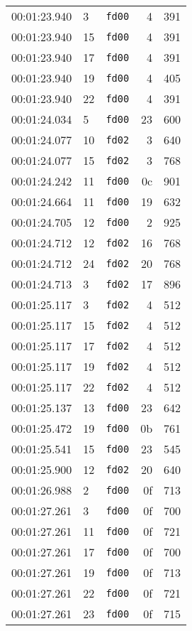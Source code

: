 \documentclass{article}
\begin{document}
\begin{longtable}{lllrr}
00:01:23.940 & 3 & \texttt{fd00} & 4 & 391 \\
00:01:23.940 & 15 & \texttt{fd00} & 4 & 391 \\
00:01:23.940 & 17 & \texttt{fd00} & 4 & 391 \\
00:01:23.940 & 19 & \texttt{fd00} & 4 & 405 \\
00:01:23.940 & 22 & \texttt{fd00} & 4 & 391 \\
00:01:24.034 & 5 & \texttt{fd00} & 23 & 600 \\
00:01:24.077 & 10 & \texttt{fd02} & 3 & 640 \\
00:01:24.077 & 15 & \texttt{fd02} & 3 & 768 \\
00:01:24.242 & 11 & \texttt{fd00} & 0c & 901 \\
00:01:24.664 & 11 & \texttt{fd00} & 19 & 632 \\
00:01:24.705 & 12 & \texttt{fd00} & 2 & 925 \\
00:01:24.712 & 12 & \texttt{fd02} & 16 & 768 \\
00:01:24.712 & 24 & \texttt{fd02} & 20 & 768 \\
00:01:24.713 & 3 & \texttt{fd02} & 17 & 896 \\
00:01:25.117 & 3 & \texttt{fd02} & 4 & 512 \\
00:01:25.117 & 15 & \texttt{fd02} & 4 & 512 \\
00:01:25.117 & 17 & \texttt{fd02} & 4 & 512 \\
00:01:25.117 & 19 & \texttt{fd02} & 4 & 512 \\
00:01:25.117 & 22 & \texttt{fd02} & 4 & 512 \\
00:01:25.137 & 13 & \texttt{fd00} & 23 & 642 \\
00:01:25.472 & 19 & \texttt{fd00} & 0b & 761 \\
00:01:25.541 & 15 & \texttt{fd00} & 23 & 545 \\
00:01:25.900 & 12 & \texttt{fd02} & 20 & 640 \\
00:01:26.988 & 2 & \texttt{fd00} & 0f & 713 \\
00:01:27.261 & 3 & \texttt{fd00} & 0f & 700 \\
00:01:27.261 & 11 & \texttt{fd00} & 0f & 721 \\
00:01:27.261 & 17 & \texttt{fd00} & 0f & 700 \\
00:01:27.261 & 19 & \texttt{fd00} & 0f & 713 \\
00:01:27.261 & 22 & \texttt{fd00} & 0f & 721 \\
00:01:27.261 & 23 & \texttt{fd00} & 0f & 715 \\

\end{longtable}
\end{document}
